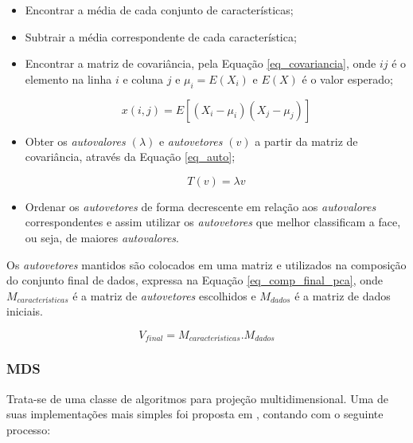 \documentclass[conference]{IEEEtran}
\begin{document}
\begin{itemize}

\item Encontrar a média de cada conjunto de características;

\item Subtrair a média correspondente de cada característica;

\item Encontrar a matriz de covariância, pela Equação \ref{eq_covariancia}, onde $ij$ é o elemento na linha $i$ e coluna $j$ e $\mu_{i} = E(X_{i})$ e $E(X)$ é o valor esperado;

\begin{equation}
x(i,j) = E[(X_{i} - \mu_{i})(X_{j} - \mu_{j})]
\label{eq_covariancia}
\end{equation}

\item Obter os \textit{autovalores $(\lambda)$} e \textit{autovetores $(v)$} a partir da matriz de covariância, através da Equação \ref{eq_auto};

\begin{equation}
T(v) = \lambda v
\label{eq_auto}
\end{equation}

\item Ordenar os \textit{autovetores} de forma decrescente em relação aos \textit{autovalores} correspondentes e assim utilizar os \textit{autovetores} que melhor classificam a face, ou seja, de maiores \textit{autovalores}. 

\end{itemize}

Os \textit{autovetores} mantidos são colocados em uma matriz e utilizados na composição do conjunto final de dados, expressa na Equação \ref{eq_comp_final_pca}, onde $M_{características}$ é a matriz de \textit{autovetores} escolhidos e $M_{dados}$ é a matriz de dados iniciais.

\begin{equation}
V_{final} = M_{características}. M_{dados}
\label{eq_comp_final_pca}
\end{equation}

\subsubsection{\textbf{MDS}}

Trata-se de uma classe de algoritmos para projeção multidimensional. Uma de suas implementações mais simples foi proposta em \cite{kruskal}, contando com o seguinte processo:
\end{document}

